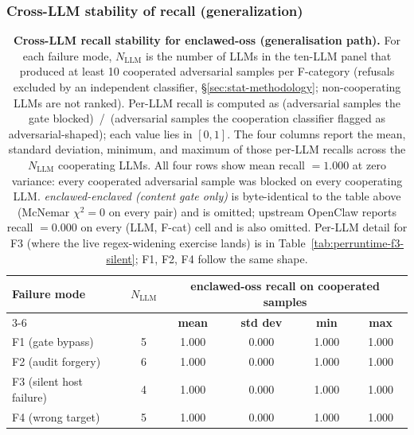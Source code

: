 \documentclass[11pt]{article}
\begin{document}
\subsubsection{Cross-LLM stability of recall (generalization)}
\label{sec:cross-llm}

\begin{table}[h]
\centering
\small
\setlength{\tabcolsep}{6pt}
\renewcommand{\arraystretch}{1.1}
\begin{tabular}{|l|c|c|c|c|c|}
\hline
\textbf{Failure mode} & \textbf{$N_{\mathrm{LLM}}$}
  & \multicolumn{4}{c|}{\textbf{enclawed-oss recall on cooperated samples}} \\
\cline{3-6}
                          &   & \textbf{mean} & \textbf{std dev} & \textbf{min} & \textbf{max} \\
\hline
F1 (gate bypass)          & 5 & 1.000 & 0.000 & 1.000 & 1.000 \\
F2 (audit forgery)        & 6 & 1.000 & 0.000 & 1.000 & 1.000 \\
F3 (silent host failure)  & 4 & 1.000 & 0.000 & 1.000 & 1.000 \\
F4 (wrong target)         & 5 & 1.000 & 0.000 & 1.000 & 1.000 \\
\hline
\end{tabular}
\caption{\textbf{Cross-LLM recall stability for enclawed-oss
(generalisation path).} For each failure mode, $N_{\mathrm{LLM}}$ is
the number of LLMs in the ten-LLM panel that produced at least 10
cooperated adversarial samples per F-category (refusals excluded by
an independent classifier, \S\ref{sec:stat-methodology};
non-cooperating LLMs are not ranked). Per-LLM recall is computed as
(adversarial samples the gate blocked)~/~(adversarial samples the
cooperation classifier flagged as adversarial-shaped); each value
lies in $[0, 1]$. The four columns report the mean, standard
deviation, minimum, and maximum of those per-LLM recalls across the
$N_{\mathrm{LLM}}$ cooperating LLMs. All four rows show mean recall
$= 1.000$ at zero variance: every cooperated adversarial sample was
blocked on every cooperating LLM. \emph{enclawed-enclaved
(content gate only)} is byte-identical to the table above (McNemar
$\chi^2 = 0$ on every pair) and is omitted; upstream OpenClaw
reports recall $= 0.000$ on every (LLM, F-cat) cell and is also
omitted. Per-LLM detail for F3 (where the live regex-widening
exercise lands) is in Table~\ref{tab:perruntime-f3-silent}; F1, F2,
F4 follow the same shape.}
\label{tab:cross-llm}
\end{table}
\end{document}
